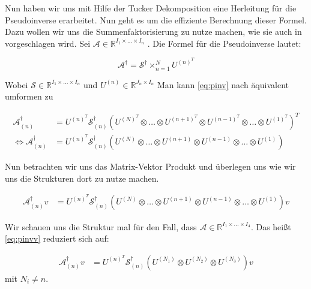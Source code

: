 Nun haben wir uns mit Hilfe der Tucker Dekomposition eine Herleitung für die Pseudoinverse erarbeitet. Nun geht es um die effiziente Berechnung dieser Formel. Dazu wollen wir uns die Summenfaktorisierung zu nutze machen, wie sie auch in \cite[9-11]{Teachlet} vorgeschlagen wird.
Sei $\mathcal{A} \in \mathbb{R}^{I_{1} \times \dots \times I_{n}}$ .
Die Formel für die Pseudoinverse lautet:

\begin{equation} \label{eq:pinv}
\mathcal{A}^{\dagger} = \mathcal{S}^{\dagger} \times_{n=1}^{N} U^{ (n) ^{T} }
\end{equation}

Wobei $\mathcal{S} \in \mathbb{R}^{I_{1} \times \dots \times I_{n}}$ und $U^{(n)} \in \mathbb{R}^{J_{n} \times I_{n}}$
Man kann \ref{eq:pinv} nach \cite[462]{Kolda} äquivalent umformen zu

\begin{equation}
\begin{aligned}
\mathcal{A}^{\dagger}_{(n)}  &= U^{ (n) ^{T} }  \mathcal{S}^{\dagger}_{(n)} ( U^{ (N) ^{T} } \otimes \dots \otimes U^{ (n+1) ^{T} } \otimes U^{ (n-1) ^{T} } \otimes \dots \otimes U^{ (1) ^{T} })^{T} \\ \iff
\mathcal{A}^{\dagger}_{(n)} &= U^{ (n) ^{T} }  \mathcal{S}^{\dagger}_{(n)} ( U^{ (N)  } \otimes \dots \otimes U^{ (n+1) } \otimes U^{ (n-1) } \otimes \dots \otimes U^{ (1) })
\end{aligned}
\end{equation}

Nun betrachten wir uns das Matrix-Vektor Produkt und überlegen uns wie wir uns die Strukturen dort zu nutze machen.

\begin{equation} \label{eq:pinvv}
\begin{aligned}
\mathcal{A}^{\dagger}_{(n)}v&= U^{ (n) ^{T} }  \mathcal{S}^{\dagger}_{(n)} ( U^{ (N)  } \otimes \dots \otimes U^{ (n+1) } \otimes U^{ (n-1) } \otimes \dots \otimes U^{ (1) }) v
\end{aligned}
\end{equation}

Wir schauen uns die Struktur mal für den Fall, dass $\mathcal{A} \in \mathbb{R}^{I_{1} \times \dots \times I_{4}}$. Das heißt \ref{eq:pinvv} reduziert sich auf:

\begin{equation} \label{eq:pinvcase}
\begin{aligned}
\mathcal{A}^{\dagger}_{(n)}v&= U^{ (n) ^{T} }  \mathcal{S}^{\dagger}_{(n)} ( U^{ (N_{1})  } \otimes U^{ (N_{2})}  \otimes U^{ (N_{3}) }) v
\end{aligned}
\end{equation}
mit $N_{i} \neq n$.

